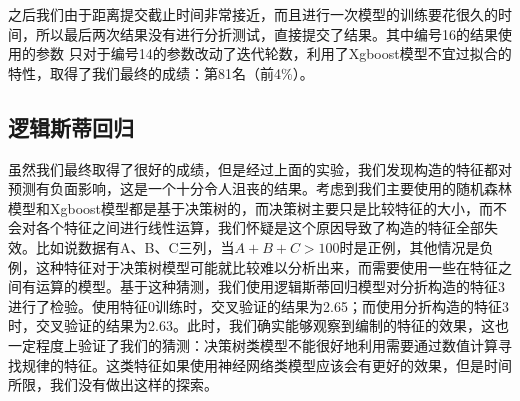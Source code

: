 之后我们由于距离提交截止时间非常接近，而且进行一次模型的训练要花很久的时间，所以最后两次结果没有进行分折测试，直接提交了结果。其中编号16的结果使用的参数
只对于编号14的参数改动了迭代轮数，利用了Xgboost模型不宜过拟合的特性，取得了我们最终的成绩：第81名（前4\%）。

\subsection{逻辑斯蒂回归}

虽然我们最终取得了很好的成绩，但是经过上面的实验，我们发现构造的特征都对预测有负面影响，这是一个十分令人沮丧的结果。考虑到我们主要使用的随机森林模型和Xgboost模型都是基于决策树的，而决策树主要只是比较特征的大小，而不会对各个特征之间进行线性运算，我们怀疑是这个原因导致了构造的特征全部失效。比如说数据有A、B、C三列，当$A+B+C>100$时是正例，其他情况是负例，这种特征对于决策树模型可能就比较难以分析出来，而需要使用一些在特征之间有运算的模型。基于这种猜测，我们使用逻辑斯蒂回归模型对分折构造的特征3进行了检验。使用特征0训练时，交叉验证的结果为2.65；而使用分折构造的特征3时，交叉验证的结果为2.63。此时，我们确实能够观察到编制的特征的效果，这也一定程度上验证了我们的猜测：决策树类模型不能很好地利用需要通过数值计算寻找规律的特征。这类特征如果使用神经网络类模型应该会有更好的效果，但是时间所限，我们没有做出这样的探索。
